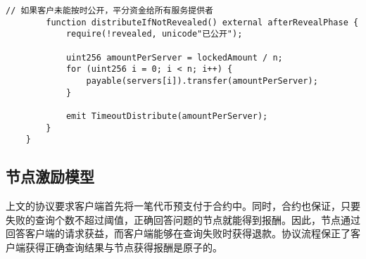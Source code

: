 \begin{lstlisting}[language=Solidity]
        // 如果客户未能按时公开，平分资金给所有服务提供者
        function distributeIfNotRevealed() external afterRevealPhase {
            require(!revealed, unicode"已公开");
    
            uint256 amountPerServer = lockedAmount / n;
            for (uint256 i = 0; i < n; i++) {
                payable(servers[i]).transfer(amountPerServer);
            }
    
            emit TimeoutDistribute(amountPerServer);
        }
    }
\end{lstlisting}

\subsection{节点激励模型}
上文的协议要求客户端首先将一笔代币预支付于合约中。同时，合约也保证，只要失败的查询个数不超过阈值，正确回答问题的节点就能得到报酬。因此，节点通过回答客户端的请求获益，而客户端能够在查询失败时获得退款。协议流程保正了客户端获得正确查询结果与节点获得报酬是原子的。